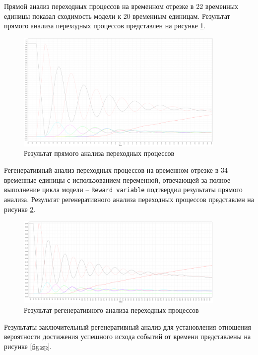 Прямой анализ переходных процессов\cite{forward-transient} на временном отрезке в 22 временных единицы показал сходимость модели к 20 временным единицам. Результат прямого анализа переходных процессов представлен на рисунке \ref{fig:ft}.

\begin{figure}[h!btp]
	\centering
	\includegraphics[width=0.9\textwidth]{inc/forward_transient.png}
	\caption{Результат прямого анализа переходных процессов}
	\label{fig:ft}
\end{figure}

Регенеративный анализ переходных процессов\cite{regenerative-transient} на временном отрезке в 34 временные единицы с использованием переменной, отвечающей за полное выполнение цикла модели -- \texttt{Reward variable}\cite{reward} подтвердил результаты прямого анализа. Результат регенеративного анализа переходных процессов представлен на рисунке \ref{fig:rt}.

\begin{figure}[h!btp]
	\centering
	\includegraphics[width=0.9\textwidth]{inc/timed_reward.png}
	\caption{Результат регенеративного анализа переходных процессов}
	\label{fig:rt}
\end{figure}

Результаты заключительный регенеративный анализ для установления отношения вероятности достижения успешного исхода событий от времени представлены на рисунке \ref{fig:sp}.

